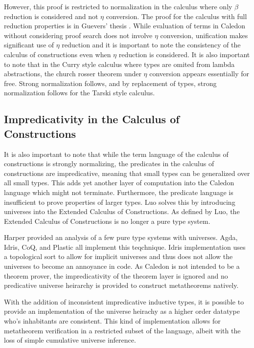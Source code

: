 However, this proof is restricted to normalization in the calculus where only $\beta$ reduction 
is considered and not $\eta$ conversion.  The proof for the calculus with full reduction properties is
in Guevers' thesis \citep{geuvers1993logics}.  While evaluation of terms in Caledon without considering proof search does
not involve $\eta$ conversion, unification makes significant use of $\eta$ reduction and it is important to note
the consistency of the calculus of constructions even when $\eta$ reduction is considered.  
It is also important to note that in the Curry style calculus where types are omited from lambda abstractions, 
the church rosser theorem under $\eta$ conversion appears essentially for free\citep{miquel2001implicit}. Strong normalization 
follows, and by replacement of types, strong normalization follows for the Tarski style calculus.

\subsection{Impredicativity in the Calculus of Constructions}

It is also important to note that while the term language of the calculus of constructions is strongly normalizing, 
the predicates in the calculus of constructions are impredicative, meaning that small types can be generalized over all small types.
This adds yet another layer of computation into the Caledon language which might not terminate.  
Furthermore, the predicate language is insufficient to prove properties of larger types. 
Luo \citep{luo1989ecc} solves this by introducing universes into the Extended Calculus of Constructions.  
As defined by Luo, the Extended Calculus of Constructions is no longer a pure type system.

Harper \citep{harper1991type} provided an analysis of a few pure type systems with universes.
Agda, Idris, CoQ,
and Plastic \citep{callaghan2001implementation} all implement this teqchnique. 
Idris implementation uses a topological sort to allow for implicit universes
and thus does not allow the universes to become an annoyance in code. 
As Caledon is not intended to be a theorem prover, the impredicativity of the theorem layer is ignored and no 
predicative universe heirarchy is provided to construct metatheorems natively.

With the addition of inconsistent impredicative inductive types, it is possible to provide an implementation 
of the universe heirachy as a higher order datatype who's inhabitants are consistent.  This kind of implementation 
allows for metatheorem verification in a restricted subset of the language, albeit with the loss of 
simple cumulative universe inference.

